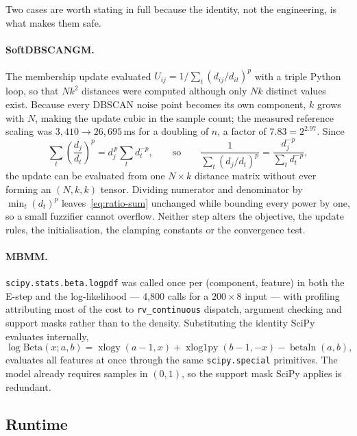 Two cases are worth stating in full because the identity, not the
engineering, is what makes them safe.

\paragraph{SoftDBSCANGM.} The membership update evaluated
$U_{ij} = 1 / \sum_t (d_{ij}/d_{it})^{p}$ with a triple Python loop, so
that $N k^2$ distances were computed although only $Nk$ distinct values
exist. Because every DBSCAN noise point becomes its own component, $k$
grows with $N$, making the update cubic in the sample count; the measured
reference scaling was $3{,}410 \to 26{,}695$\,ms for a doubling of $n$, a
factor of $7.83 = 2^{2.97}$. Since
\begin{equation}
\sum_t \left(\frac{d_j}{d_t}\right)^{p}
   = d_j^{\,p} \sum_t d_t^{-p},
\qquad\text{so}\qquad
\frac{1}{\sum_t (d_j/d_t)^{p}}
   = \frac{d_j^{-p}}{\sum_t d_t^{-p}},
\label{eq:ratio-sum}
\end{equation}
the update can be evaluated from one $N \times k$ distance matrix without
ever forming an $(N,k,k)$ tensor. Dividing numerator and denominator by
$\min_t (d_t)^{p}$ leaves~\eqref{eq:ratio-sum} unchanged while bounding
every power by one, so a small fuzzifier cannot overflow. Neither step
alters the objective, the update rules, the initialisation, the clamping
constants or the convergence test.

\paragraph{MBMM.} \texttt{scipy.stats.beta.logpdf} was called once per
(component, feature) in both the E-step and the log-likelihood ---
4,800 calls for a $200 \times 8$ input --- with profiling attributing
most of the cost to \texttt{rv\_continuous} dispatch, argument checking
and support masks rather than to the density. Substituting the identity
SciPy evaluates internally,
\begin{equation}
\log \mathrm{Beta}(x; a, b)
  = \operatorname{xlogy}(a - 1, x)
  + \operatorname{xlog1py}(b - 1, -x)
  - \operatorname{betaln}(a, b),
\label{eq:beta-logpdf}
\end{equation}
evaluates all features at once through the same
\texttt{scipy.special} primitives. The model already requires samples in
$(0,1)$, so the support mask SciPy applies is redundant.

\subsection{Runtime}
\label{app:opt:runtime}

